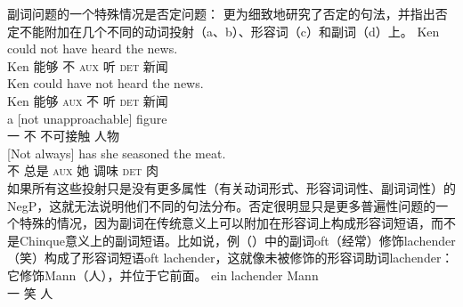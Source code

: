副词问题的一个特殊情况是否定问题： \citet{Ernst92a}更为细致地研究了否定的句法，并指出否定不能附加在几个不同的动词投射（a、b）、形容词（c）和副词（d）上。
\eal
\ex 
\gll Ken could not have heard the news.\\
Ken 能够 不 \textsc{aux} 听 \textsc{det} 新闻\\
\ex 
\gll Ken could have not heard the news.\\
Ken 能够 \textsc{aux} 不 听 \textsc{det} 新闻\\
\ex 
\gll a [not unapproachable] figure\\
一 \spacebr{}不 不可接触 人物\\
\ex 
\gll {}[Not always] has she seasoned the meat.\\
{}\spacebr{}不 总是 \textsc{aux} 她 调味 \textsc{det} 肉\\
\zl
如果所有这些投射只是没有更多属性（有关动词形式、形容词词性、副词词性）的NegP，这就无法说明他们不同的句法分布。否定很明显只是更多普遍性问题的一个特殊的情况，因为副词在传统意义上可以附加在形容词上构成形容词短语，而不是Chinque意义上的副词短语。比如说，例（）中的副词oft（经常）修饰lachender（笑）构成了形容词短语oft lachender，这就像未被修饰的形容词助词lachender：它修饰Mann（人），并位于它前面。
\eal
\ex
\gll ein lachender Mann\\
     一 笑 人\\
